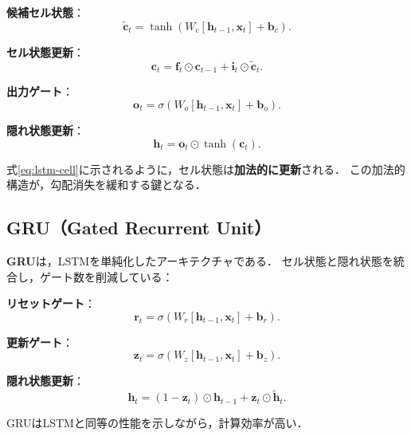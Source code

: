 \textbf{候補セル状態}：
\begin{equation}
  \tilde{\boldsymbol{c}}_t = \tanh(W_c[\boldsymbol{h}_{t-1}, \boldsymbol{x}_t] + \boldsymbol{b}_c).
\end{equation}

\textbf{セル状態更新}：
\begin{equation}
  \boldsymbol{c}_t = \boldsymbol{f}_t \odot \boldsymbol{c}_{t-1} + \boldsymbol{i}_t \odot \tilde{\boldsymbol{c}}_t.
  \label{eq:lstm-cell}
\end{equation}

\textbf{出力ゲート}：
\begin{equation}
  \boldsymbol{o}_t = \sigma(W_o[\boldsymbol{h}_{t-1}, \boldsymbol{x}_t] + \boldsymbol{b}_o).
\end{equation}

\textbf{隠れ状態更新}：
\begin{equation}
  \boldsymbol{h}_t = \boldsymbol{o}_t \odot \tanh(\boldsymbol{c}_t).
\end{equation}

式\eqref{eq:lstm-cell}に示されるように，セル状態は\textbf{加法的に更新}される．
この加法的構造が，勾配消失を緩和する鍵となる．

\subsection{GRU（Gated Recurrent Unit）}

\textbf{GRU}\cite{Cho2014}は，LSTMを単純化したアーキテクチャである．
セル状態と隠れ状態を統合し，ゲート数を削減している：

\textbf{リセットゲート}：
\begin{equation}
  \boldsymbol{r}_t = \sigma(W_r[\boldsymbol{h}_{t-1}, \boldsymbol{x}_t] + \boldsymbol{b}_r).
\end{equation}

\textbf{更新ゲート}：
\begin{equation}
  \boldsymbol{z}_t = \sigma(W_z[\boldsymbol{h}_{t-1}, \boldsymbol{x}_t] + \boldsymbol{b}_z).
\end{equation}

\textbf{隠れ状態更新}：
\begin{equation}
  \boldsymbol{h}_t = (1 - \boldsymbol{z}_t) \odot \boldsymbol{h}_{t-1} + \boldsymbol{z}_t \odot \tilde{\boldsymbol{h}}_t.
\end{equation}

GRUはLSTMと同等の性能を示しながら，計算効率が高い．

